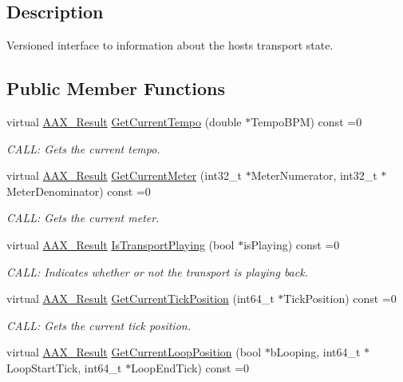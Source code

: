\subsection{Description}
Versioned interface to information about the host\textquotesingle{}s transport state. \subsection*{Public Member Functions}
\begin{DoxyCompactItemize}
\item 
virtual \mbox{\hyperlink{a00392_a4d8f69a697df7f70c3a8e9b8ee130d2f}{A\+A\+X\+\_\+\+Result}} \mbox{\hyperlink{a01757_ac0818801e66a6840216ac3657d7abcf1}{Get\+Current\+Tempo}} (double $\ast$Tempo\+B\+PM) const =0
\begin{DoxyCompactList}\small\item\em C\+A\+LL\+: Gets the current tempo. \end{DoxyCompactList}\item 
virtual \mbox{\hyperlink{a00392_a4d8f69a697df7f70c3a8e9b8ee130d2f}{A\+A\+X\+\_\+\+Result}} \mbox{\hyperlink{a01757_a8728c5cab60582e4a143f665a683ee7c}{Get\+Current\+Meter}} (int32\+\_\+t $\ast$Meter\+Numerator, int32\+\_\+t $\ast$Meter\+Denominator) const =0
\begin{DoxyCompactList}\small\item\em C\+A\+LL\+: Gets the current meter. \end{DoxyCompactList}\item 
virtual \mbox{\hyperlink{a00392_a4d8f69a697df7f70c3a8e9b8ee130d2f}{A\+A\+X\+\_\+\+Result}} \mbox{\hyperlink{a01757_adbcf084e01f37cb46fdb0f3024f02515}{Is\+Transport\+Playing}} (bool $\ast$is\+Playing) const =0
\begin{DoxyCompactList}\small\item\em C\+A\+LL\+: Indicates whether or not the transport is playing back. \end{DoxyCompactList}\item 
virtual \mbox{\hyperlink{a00392_a4d8f69a697df7f70c3a8e9b8ee130d2f}{A\+A\+X\+\_\+\+Result}} \mbox{\hyperlink{a01757_a3d60e3c360e1881bd5716a119d096769}{Get\+Current\+Tick\+Position}} (int64\+\_\+t $\ast$Tick\+Position) const =0
\begin{DoxyCompactList}\small\item\em C\+A\+LL\+: Gets the current tick position. \end{DoxyCompactList}\item 
virtual \mbox{\hyperlink{a00392_a4d8f69a697df7f70c3a8e9b8ee130d2f}{A\+A\+X\+\_\+\+Result}} \mbox{\hyperlink{a01757_aa59e02326a236afc153637d54f4789be}{Get\+Current\+Loop\+Position}} (bool $\ast$b\+Looping, int64\+\_\+t $\ast$Loop\+Start\+Tick, int64\+\_\+t $\ast$Loop\+End\+Tick) const =0

\end{DoxyCompactItemize}
